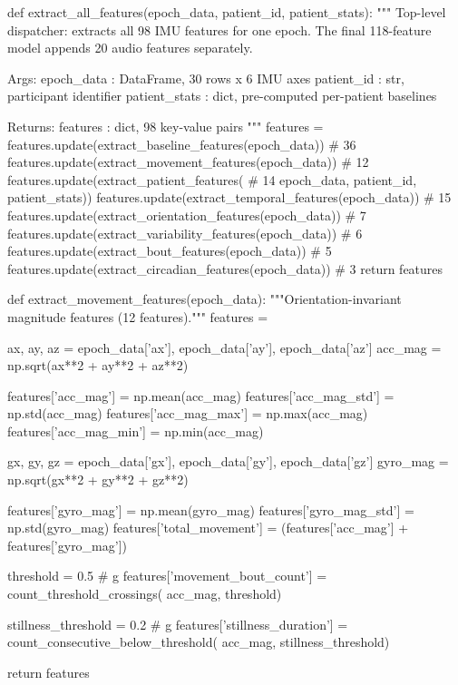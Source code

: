 \begin{pycode}
def extract_all_features(epoch_data, patient_id, patient_stats):
    """
    Top-level dispatcher: extracts all 98 IMU features for one epoch.
    The final 118-feature model appends 20 audio features separately.

    Args:
        epoch_data    : DataFrame, 30 rows x 6 IMU axes
        patient_id    : str, participant identifier
        patient_stats : dict, pre-computed per-patient baselines

    Returns:
        features : dict, 98 key-value pairs
    """
    features = {}
    features.update(extract_baseline_features(epoch_data))        # 36
    features.update(extract_movement_features(epoch_data))        # 12
    features.update(extract_patient_features(                     # 14
        epoch_data, patient_id, patient_stats))
    features.update(extract_temporal_features(epoch_data))        # 15
    features.update(extract_orientation_features(epoch_data))     #  7
    features.update(extract_variability_features(epoch_data))     #  6
    features.update(extract_bout_features(epoch_data))            #  5
    features.update(extract_circadian_features(epoch_data))       #  3
    return features
\end{pycode}

\begin{pycode}
def extract_movement_features(epoch_data):
    """Orientation-invariant magnitude features (12 features)."""
    features = {}

    ax, ay, az = epoch_data['ax'], epoch_data['ay'], epoch_data['az']
    acc_mag    = np.sqrt(ax**2 + ay**2 + az**2)

    features['acc_mag']     = np.mean(acc_mag)
    features['acc_mag_std'] = np.std(acc_mag)
    features['acc_mag_max'] = np.max(acc_mag)
    features['acc_mag_min'] = np.min(acc_mag)

    gx, gy, gz = epoch_data['gx'], epoch_data['gy'], epoch_data['gz']
    gyro_mag   = np.sqrt(gx**2 + gy**2 + gz**2)

    features['gyro_mag']     = np.mean(gyro_mag)
    features['gyro_mag_std'] = np.std(gyro_mag)
    features['total_movement'] = (features['acc_mag'] +
                                  features['gyro_mag'])

    threshold = 0.5   # g
    features['movement_bout_count'] = count_threshold_crossings(
        acc_mag, threshold)

    stillness_threshold = 0.2   # g
    features['stillness_duration'] = count_consecutive_below_threshold(
        acc_mag, stillness_threshold)

    return features
\end{pycode}

